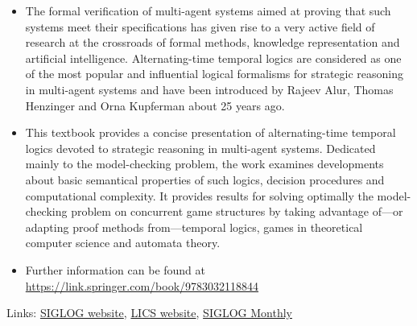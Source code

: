 \documentclass[prodmode,acmtecs]{acmsmall} %
\begin{document}
\begin{itemize}\item  The formal verification of multi-agent systems aimed at proving that such systems meet their specifications has given rise to a very active field of research at the crossroads of formal methods, knowledge representation and artificial intelligence. Alternating-time temporal logics are considered as one of the most popular and influential logical formalisms for strategic reasoning in multi-agent systems and have been introduced by Rajeev Alur, Thomas Henzinger and Orna Kupferman about 25 years ago.  
 
\item  This textbook provides a concise presentation of alternating-time temporal logics devoted to strategic reasoning in multi-agent systems. Dedicated mainly to the model-checking problem, the work examines developments about basic semantical properties of such logics, decision procedures and computational complexity. It provides results for solving optimally the model-checking problem on concurrent game structures by taking advantage of—or adapting proof methods from—temporal logics, games in theoretical computer science and automata theory. 
 
\item  Further information can be found at \href{https://link.springer.com/book/9783032118844}{https://link.springer.com/book/9783032118844} 
 
\end{itemize}


\bigskip Links: \href{http://siglog.org/}{SIGLOG website}, \href{https://lics.siglog.org}{LICS website}, \href{https://lics.siglog.org/newsletters/}{SIGLOG Monthly}
\end{document}
